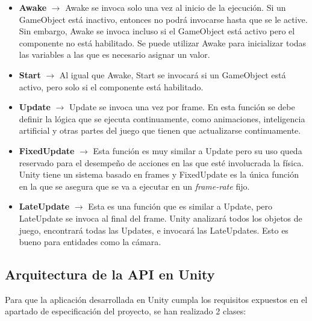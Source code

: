 \begin {itemize}
\item \textbf{Awake} $\rightarrow$  Awake se invoca solo una vez al inicio de la ejecuci\'on. Si un GameObject est\'a inactivo, entonces no podr\'a invocarse hasta que se le active. Sin embargo, Awake se invoca incluso si el GameObject est\'a activo pero el componente no est\'a habilitado. Se puede utilizar Awake para inicializar todas las variables a las que es necesario asignar un valor.
\item \textbf{Start} $\rightarrow$ Al igual que Awake, Start se invocar\'a si un GameObject est\'a activo, pero solo si el componente est\'a habilitado.
\item \textbf{Update} $\rightarrow$ Update se invoca una vez por frame. En esta funci\'on se debe definir la l\'ogica que se ejecuta continuamente, como animaciones, inteligencia artificial y otras partes del juego que tienen que actualizarse continuamente.
\item \textbf{FixedUpdate} $\rightarrow$ Esta funci\'on es muy similar a Update pero su uso queda reservado para el desempe\~no de acciones en las que est\'e involucrada la f\'isica. Unity tiene un sistema basado en frames y FixedUpdate es la \'unica funci\'on en la que se asegura que se va a ejecutar en un \textit{frame-rate} fijo. 
\item \textbf{LateUpdate} $\rightarrow$ Esta es una funci\'on que es similar a Update, pero LateUpdate se invoca al final del frame. Unity analizar\'a todos los objetos de juego, encontrar\'a todas las Updates, e invocar\'a las LateUpdates. Esto es bueno para entidades como la c\'amara.
\end {itemize}



\subsection {Arquitectura de la API en Unity}

Para que la aplicaci\'on desarrollada en Unity cumpla los requisitos expuestos en el apartado de especificaci\'on del proyecto, se han realizado 2 clases:

